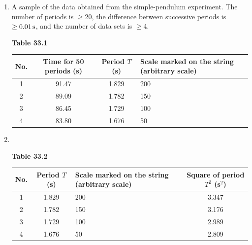 \begin{enumerate}[label=(\arabic*)]
Equation (1) is the equation of simple harmonic motion; its angular frequency $\omega$ is
\begin{equation*}
\omega = \frac{2\pi}{T_{\mathrm{osc}}} = \sqrt{\frac{g}{l}},\qquad
T^2 = 4\pi^2\frac{l}{g}.
\end{equation*}

Expression for the measured quantity: period $T = 2\pi\sqrt{\dfrac{l}{g}}$.

Approximations: an ideal simple pendulum satisfies the conditions that the mass of the string is much smaller than the mass of the steel ball, the radius of the steel ball is much smaller than the length of the string, and the stretching of the string and the air resistance are neglected.

\item A sample of the data obtained from the simple-pendulum experiment. The number of periods is $\ge 20$, the difference between successive periods is $\ge 0.01\,\mathrm{s}$, and the number of data sets is $\ge 4$.

\begin{center}
\small\textbf{Table 33.1}
\end{center}
\begin{center}
\small
\begin{tabular}{cccp{3.4cm}}
\toprule
No. & Time for 50 periods (s) & Period $T$ (s) & Scale marked on the string (arbitrary scale) \\
\midrule
1 & 91.47 & 1.829 & 200 \\
2 & 89.09 & 1.782 & 150 \\
3 & 86.45 & 1.729 & 100 \\
4 & 83.80 & 1.676 & 50 \\
\bottomrule
\end{tabular}
\end{center}

\item ~

\begin{center}
\small\textbf{Table 33.2}
\end{center}
\begin{center}
\small
\begin{tabular}{ccp{3.4cm}c}
\toprule
No. & Period $T$ (s) & Scale marked on the string (arbitrary scale) & Square of period $T^2$ (s$^2$) \\
\midrule
1 & 1.829 & 200 & 3.347 \\
2 & 1.782 & 150 & 3.176 \\
3 & 1.729 & 100 & 2.989 \\
4 & 1.676 & 50 & 2.809 \\
\bottomrule
\end{tabular}
\end{center}


\end{enumerate}
